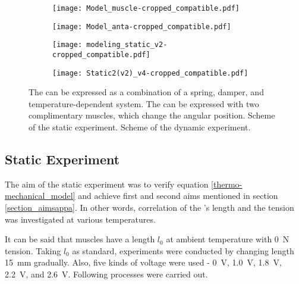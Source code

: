 \begin{figure}[t]
	\centering
	\begin{subfigure}[t]{0.2\textwidth}
		\centering\texttt{[image: Model\_muscle-cropped\_compatible.pdf]}
		\caption{\label{ModelMus}}
	\end{subfigure}
	\begin{subfigure}[t]{0.31\textwidth}
		\centering\texttt{[image: Model\_anta-cropped\_compatible.pdf]}
		\caption{\label{ModelAnt}}
	\end{subfigure}
	\begin{subfigure}[t]{0.22\textwidth}
		\centering\texttt{[image: modeling\_static\_v2-cropped\_compatible.pdf]}
		\caption{\label{static_sch}}
	\end{subfigure}
	\begin{subfigure}[t]{0.22\textwidth}
		\centering\texttt{[image: Static2(v2)\_v4-cropped\_compatible.pdf]} %
		\caption{\label{dynamic_sch}}
	\end{subfigure}
	\caption[Modeling of the \scps]{ The \scps can be expressed as a combination of a spring, damper, and temperature-dependent system.  The \anta can be expressed with two complimentary muscles, which change the angular position.  Scheme of the static experiment.  Scheme of the dynamic experiment.}
	\label{model+exp_sch}
\end{figure}

\subsection{Static Experiment}
The aim of the static experiment was to verify equation \eqref{thermo-mechanical_model} and achieve first and second aims mentioned in section \ref{section_aimsappa}. In other words, correlation of the \scpnospace's length and the tension was investigated at various temperatures. 

It can be said that muscles have a length $l_{0}$ at ambient temperature with \SI{0}{\newton} tension. Taking $l_{0}$ as standard, experiments were conducted by changing length \SI{15}{\milli\meter} gradually. Also, five kinds of voltage were used - \SI{0}{\volt}, \SI{1.0}{\volt}, \SI{1.8}{\volt}, \SI{2.2}{\volt}, and \SI{2.6}{\volt}. 
Following processes were carried out.


